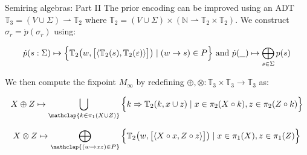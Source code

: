 \documentclass{beamer}
\newcommand{\hole}{\underline{\hspace{0.25cm}}}
\begin{document}
\begin{frame}[fragile]{Semiring algebras: Part II}
  The prior encoding can be improved using an ADT $\mathbb{T}_3 = (V \cup \Sigma) \rightharpoonup \mathbb{T}_2$ where $\mathbb{T}_2 = (V \cup \Sigma) \times (\mathbb{N} \rightharpoonup \mathbb{T}_2\times\mathbb{T}_2)$. We construct $\hat\sigma_r = \dot{p}(\sigma_r)$ using:

  \begin{equation*}
    \dot{p}(s: \Sigma) \mapsto \Big\{\mathbb{T}_2\big(w, \big[\langle\mathbb{T}_2(s), \mathbb{T}_2(\varepsilon)\rangle\big]\big) \mid (w \rightarrow s)\in P\Big\} \text{ and } \dot{p}(\hole) \mapsto \bigoplus_{s\in \Sigma} p(s)
  \end{equation*}

  \noindent We then compute the fixpoint $M_\infty$ by redefining $\oplus, \otimes: \mathbb{T}_3 \times \mathbb{T}_3 \rightarrow \mathbb{T}_3$ as:

  \begin{equation*}
    X \oplus Z \mapsto \bigcup_{\mathclap{k\in \pi_1(X \cup Z)}}\Big\{k \Rightarrow \mathbb{T}_2(k, x \cup z) \mid x \in \pi_2(X\circ k), z \in \pi_2(Z\circ k)\Big\}
  \end{equation*}

  \begin{equation*}
    X \otimes Z \mapsto \bigoplus_{\mathclap{(w\rightarrow xz) \in P}}\Big\{\mathbb{T}_2\big(w, \big[\langle X\circ x, Z\circ z\rangle\big]\big) \mid x \in \pi_1(X), z \in \pi_1(Z)\Big\}
  \end{equation*}
\end{frame}
\end{document}

